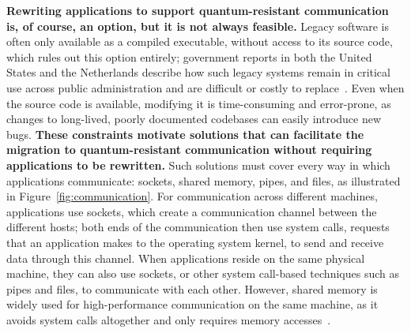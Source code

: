 \documentclass[a4paper,10pt,fleqn]{application}
\begin{document}
\medskip

\textbf{Rewriting applications to support quantum-resistant communication is, of course, an option, but it is not always feasible.} Legacy software is often only available as a compiled executable, without access to its source code, which rules out this option entirely; government reports in both the United States and the Netherlands describe how such legacy systems %
remain in critical use across public administration and are difficult or costly to replace~\cite{GAO2025LegacySystems,AcICT2025Legacy}. Even when the source code is available, modifying it is time-consuming and error-prone, as changes to long-lived, poorly documented codebases can easily introduce new bugs. \textbf{These constraints motivate solutions that can facilitate the migration to quantum-resistant communication without requiring applications to be rewritten.}
Such solutions must cover every way in which applications communicate: sockets, shared memory, pipes, and files, as illustrated in Figure~\ref{fig:communication}. For communication across different machines, applications use sockets, which create a communication channel between the different hosts; both ends of the communication then use system calls, requests that an application makes to the operating system kernel, to send and receive data through this channel. When applications reside on the same physical machine, they can also use sockets, or other system call-based techniques such as pipes and files, to communicate with each other. However, shared memory is widely used for high-performance communication on the same machine, as it avoids system calls altogether and only requires memory accesses~\cite{Volckaert2016ReMon}.

\medskip
\end{document}
